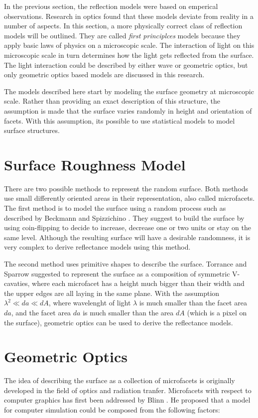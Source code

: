 \hypertarget{Microfacet Models}{
}

\noindent In the previous section, the reflection models were based on emperical observations. Research in optics found that these models deviate from reality in a number of aspects. In this section, a more physically correct class of reflection models will be outlined. They are called \textit{first principlces} models because they apply basic laws of physics on a microscopic scale. The interaction of light on this microscopic scale in turn determines how the light gets reflected from the surface. The light interaction could be described by either wave or geometric optics, but only geometric optics based models are discussed in this research.

The models described here start by modeling the surface geometry at microscopic scale. Rather than providing an exact description of this structure, the assumption is made that the surface varies randomly in height and orientation of facets. With this assumption, its possible to use statistical models to model surface structures.

\section{Surface Roughness Model}
There are two possible methods to represent the random surface. Both methods use small differently oriented areas in their representation, also called microfacets. The first method is to model the surface using a random process such as described by Beckmann and Spizzichino \cite{BeckmannSpizzichino}. They suggest to build the surface by using coin-flipping to decide to increase, decrease one or two units or stay on the same level. Although the resulting surface will have a desirable randomness, it is very complex to derive reflectance models using this method. 

The second method uses primitive shapes to describe the surface. Torrance and Sparrow suggested to represent the surface as a composition of symmetric V-cavaties, where each microfacet has a height much bigger than their width and the upper edges are all laying in the same plane. With the assumption $\lambda^2 \ll da \ll dA$, where wavelenght of light $\lambda$ is much smaller than the facet area $da$, and the facet area $da$ is much smaller than the area $dA$ (which is a pixel on the surface), geometric optics can be used to derive the reflectance models.

\section{Geometric Optics}
The idea of describing the surface as a collection of microfacets is originally developed in the field of optics and radiation tranfer. Microfacets with respect to computer graphics has first been addressed by Blinn \cite{Blinn}. He proposed that a model for computer simulation could be composed from the following factors:

